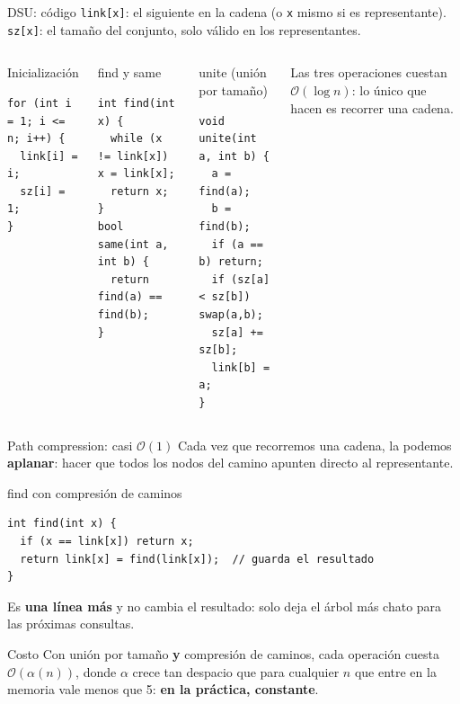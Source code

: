 \documentclass{beamer}
\begin{document}
\begin{frame}[fragile]{DSU: código}
    \texttt{link[x]}: el siguiente en la cadena (o \texttt{x} mismo si es
    representante). \texttt{sz[x]}: el tamaño del conjunto, solo válido en los
    representantes.
    \begin{columns}[t]
        \begin{block}{Inicialización}
        \footnotesize
\begin{verbatim}
for (int i = 1; i <= n; i++) {
  link[i] = i;
  sz[i] = 1;
}
\end{verbatim}
        \end{block}
        \begin{block}{find y same}
        \footnotesize
\begin{verbatim}
int find(int x) {
  while (x != link[x]) x = link[x];
  return x;
}
bool same(int a, int b) {
  return find(a) == find(b);
}
\end{verbatim}
        \end{block}
        \begin{block}{unite (unión por tamaño)}
        \footnotesize
\begin{verbatim}
void unite(int a, int b) {
  a = find(a);
  b = find(b);
  if (a == b) return;
  if (sz[a] < sz[b]) swap(a,b);
  sz[a] += sz[b];
  link[b] = a;
}
\end{verbatim}
        \end{block}
        \footnotesize Las tres operaciones cuestan $\mathcal{O}(\log n)$:
        lo único que hacen es recorrer una cadena.
    \end{columns}
\end{frame}


\begin{frame}[fragile]{Path compression: casi $\mathcal{O}(1)$}
    Cada vez que recorremos una cadena, la podemos \textbf{aplanar}: hacer que
    todos los nodos del camino apunten directo al representante.
    \begin{block}{find con compresión de caminos}
    \footnotesize
\begin{verbatim}
int find(int x) {
  if (x == link[x]) return x;
  return link[x] = find(link[x]);  // guarda el resultado
}
\end{verbatim}
    \end{block}

    \vspace{0.1cm}
    Es \textbf{una línea más} y no cambia el resultado: solo deja el árbol más
    chato para las próximas consultas.

    \vspace{0.2cm}
    \begin{block}{Costo}
        Con unión por tamaño \textbf{y} compresión de caminos, cada operación
        cuesta $\mathcal{O}(\alpha(n))$, donde $\alpha$ crece tan despacio que
        para cualquier $n$ que entre en la memoria vale menos que 5:
        \textbf{en la práctica, constante}.
    \end{block}
\end{frame}
\end{document}
